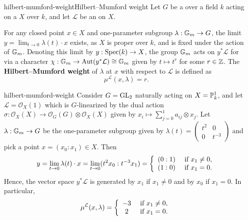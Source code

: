 \begin{topic}{hilbert-mumford-weight}{Hilbert--Mumford weight}
    Let $G$ be a  over a field $k$ acting on a  $X$  over $k$, and let $\mathcal{L}$ be an    on $X$.

    For any closed point $x \in X$ and one-parameter subgroup $\lambda : \mathbb{G}_m \to G$, the limit $y = \lim_{t \to 0} \lambda(t) \cdot x$ exists, as $X$ is proper over $k$, and is fixed under the action of $\mathbb{G}_m$. Denoting this limit by $y : \operatorname{Spec}(k) \to X$, the group $\mathbb{G}_m$ acts on $y^* \mathcal{L}$ for via a character $\chi : \mathbb{G}_m \to \operatorname{Aut}(y^* \mathcal{L}) \cong \mathbb{G}_m$ given by $t \mapsto t^r$ for some $r \in \mathbb{Z}$. The \textbf{Hilbert--Mumford weight} of $\lambda$ at $x$ with respect to $\mathcal{L}$ is defined as
    \[ \mu^\mathcal{L}(x, \lambda) = r. \]
\end{topic}

\begin{example}{hilbert-mumford-weight}
    Consider $G = \textup{GL}_2$ naturally acting on $X = \mathbb{P}^1_k$, and let $\mathcal{L} = \mathcal{O}_X(1)$ which is $G$-linearized by the dual action $\hat{\sigma} : \mathcal{O}_X(X) \to \mathcal{O}_G(G) \otimes \mathcal{O}_X(X)$ given by $x_i \mapsto \sum_{j = 0}^{1} a_{ij} \otimes x_j$.
    Let $\lambda : \mathbb{G}_m \to G$ be the one-parameter subgroup given by $\lambda(t) = \left(\begin{smallmatrix} t^2 & 0 \\ 0 & t^{-3} \end{smallmatrix}\right)$ and pick a point $x = (x_0 : x_1) \in X$. Then
    \[ y = \lim_{t \to 0} \lambda(t) \cdot x = \lim_{t \to 0} (t^2 x_0 : t^{-3} x_1) = \left\{ \begin{array}{cl} (0 : 1) & \textup{ if } x_1 \ne 0, \\ (1 : 0) & \textup{ if } x_1 = 0 . \end{array} \right. \]
    Hence, the vector space $y^* \mathcal{L}$ is generated by $x_1$ if $x_1 \ne 0$ and by $x_0$ if $x_1 = 0$. In particular,
    \[ \mu^\mathcal{L}(x, \lambda) = \left\{ \begin{array}{cl} -3 & \textup{ if } x_1 \ne 0, \\ 2 & \textup{ if } x_1 = 0 .
    \end{array} \right. \]
\end{example}

